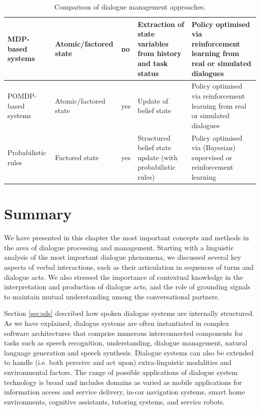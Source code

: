\begin{table}
\begin{center}
\begin{tabular}{|p{55mm}||p{31mm}|p{16mm}|p{50mm}|p{66mm}|}
MDP-based systems  \; \; \; \; \; \; \; \; \begin{footnotesize}\citep[e.g.][]{Walker:2000,817450}\end{footnotesize} & Atomic/factored state & no & Extraction of state variables from history and task status & Policy optimised via reinforcement learning from real or simulated dialogues \vspace{5pt} \\ \hline
POMDP-based systems \; \; \; \; \; \; \begin{footnotesize}\citep[e.g.][]{Roy:2000,Young:2010}\end{footnotesize}\vspace{5pt} & Atomic/factored state & yes & Update of belief state & Policy optimised via reinforcement learning from real or simulated dialogues \vspace{5pt} \\ \hline
Probabilistic rules & Factored state & yes & Structured belief state update (with probabilistic rules) & Policy optimised via (Bayesian) supervised or reinforcement learning \vspace{5pt} \\ \hline 
\end{tabular}
\end{center}
\caption{Comparison of dialogue management approaches.}
\label{table:approaches}
\end{table}


\section{Summary}

We have presented in this chapter the most important concepts and methods in the area of dialogue processing and management.  Starting with a linguistic analysis of the most important dialogue phenomena, we discussed several key aspects of verbal interactions, such as their articulation in sequences of turns and dialogue acts. We also stressed the importance of contextual knowledge in the interpretation and production of dialogue acts, and the role of grounding signals to maintain mutual understanding among the conversational partners. 

Section \ref{sec:sds} described how spoken dialogue systems are internally structured. As we have explained, dialogue systems are often instantiated in complex software architectures that comprise numerous interconnected components for tasks such as speech recognition, understanding, dialogue management, natural language generation and speech synthesis.  Dialogue systems can also be extended to handle (i.e. both perceive and act upon) extra-linguistic modalities and environmental factors. The range of possible applications of dialogue system technology is broad and includes domains as varied as mobile applications for information access and service delivery, in-car navigation systems, smart home environments, cognitive assistants, tutoring systems, and service robots. 


